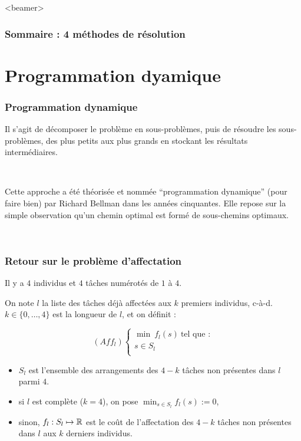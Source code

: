 \documentclass{beamer}
\newcommand{\R}{{\ensuremath\mathbb{R}}}
\begin{document}
\begin{frame}<beamer>
  \frametitle{Sommaire : 4 méthodes de résolution}
  \tableofcontents[sections={2,3},sectionstyle=shaded/shaded]
  \tableofcontents[sections={5,6}]
\end{frame}

\section{Programmation dyamique}

\begin{frame}
  \frametitle{Programmation dynamique}

  Il s'agit de décomposer le problème en sous-problèmes, puis de résoudre les sous-problèmes,
  des plus petits aux plus grands en stockant les résultats intermédiaires.

  ~
  
  Cette approche a été théorisée et nommée ``programmation dynamique'' (pour faire bien)
  par Richard Bellman dans les années cinquantes. Elle repose sur la simple observation
  qu'un chemin optimal est formé de sous-chemins optimaux.

  ~
  
\end{frame}
  
\begin{frame}
  \frametitle{Retour sur le problème d'affectation}

  Il y a $4$ individus et $4$ tâches numérotés de $1$ à $4$.
  
  On note $l$ la liste des tâches déjà affectées aux $k$
  premiers individus, c-à-d. $k \in \{0,\dots,4\}$ est
  la longueur de $l$, et on définit :  

  \[
  (Aff_l) \left\{
  \begin{array}{c}
    \min \ f_l(s) \ \text{tel que :} \\
    s \in S_l \\
  \end{array}
  \right.
  \]

  \begin{itemize}
  \item $S_l$ est l'ensemble des arrangements des $4-k$ tâches
    non présentes dans $l$ parmi $4$.  
  \item si $l$ est complète ($k = 4$), on pose $\min_{s \in S_l} f_l(s) := 0$,
  \item sinon, $f_l : S_l \mapsto \R$ est le coût de l'affectation
      des $4-k$ tâches non présentes dans $l$ aux $k$ derniers individus.
  \end{itemize}

\end{frame}
\end{document}
